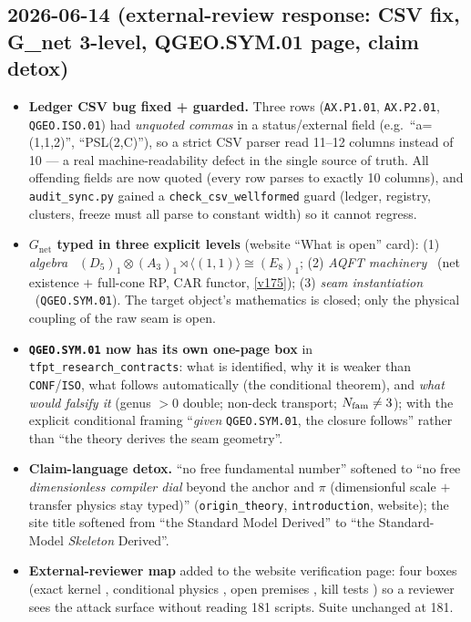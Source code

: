 \subsection*{2026-06-14 (external-review response: CSV fix, G\_net 3-level, QGEO.SYM.01 page, claim detox)}
\begin{itemize}
\item \textbf{Ledger CSV bug fixed + guarded.} Three rows (\texttt{AX.P1.01}, \texttt{AX.P2.01},
  \texttt{QGEO.ISO.01}) had \emph{unquoted commas} in a status/external field (e.g.\ ``a=(1,1,2)'',
  ``PSL(2,C)''), so a strict CSV parser read 11--12 columns instead of 10 --- a real
  machine-readability defect in the single source of truth. All offending fields are now quoted (every
  row parses to exactly 10 columns), and \texttt{audit\_sync.py} gained a \texttt{check\_csv\_wellformed}
  guard (ledger, registry, clusters, freeze must all parse to constant width) so it cannot regress.
\item \textbf{$G_{\mathrm{net}}$ typed in three explicit levels} (website ``What is open'' card): (1)
  \emph{algebra} \mE\ $(D_5)_1{\otimes}(A_3)_1{\rtimes}\langle(1,1)\rangle\cong(E_8)_1$; (2) \emph{AQFT
  machinery} \mE\ (net existence $+$ full-cone RP, CAR functor, \vref{v175}); (3) \emph{seam
  instantiation} \mO\ (\texttt{QGEO.SYM.01}). The target object's mathematics is closed; only the
  physical coupling of the raw seam is open.
\item \textbf{\texttt{QGEO.SYM.01} now has its own one-page box} in \texttt{tfpt\_research\_contracts}:
  what is identified, why it is weaker than \texttt{CONF}/\texttt{ISO}, what follows automatically (the
  conditional theorem), and \emph{what would falsify it} (genus $>0$ double; non-deck transport;
  $N_{\mathrm{fam}}\neq3$); with the explicit conditional framing ``\emph{given} \texttt{QGEO.SYM.01}, the closure
  follows'' rather than ``the theory derives the seam geometry''.
\item \textbf{Claim-language detox.} ``no free fundamental number'' softened to ``no free
  \emph{dimensionless compiler dial} beyond the anchor and $\pi$ (dimensionful scale $+$ transfer
  physics stay typed)'' (\texttt{origin\_theory}, \texttt{introduction}, website); the site title
  softened from ``the Standard Model Derived'' to ``the Standard-Model \emph{Skeleton} Derived''.
\item \textbf{External-reviewer map} added to the website verification page: four boxes (exact kernel
  \mE, conditional physics \mC, open premises \mO, kill tests \mX) so a reviewer sees the attack
  surface without reading 181 scripts. Suite unchanged at 181.
\end{itemize}


